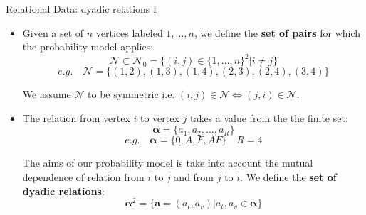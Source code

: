 \documentclass[aspectratio=169,xcolor=dvipsnames]{beamer}
\newcommand{\veca}{\boldsymbol{a}}
\newcommand{\vecalpha}{\boldsymbol{\alpha}}
\newcommand{\setn}{\mathcal{N}}
\begin{document}
\begin{frame}{Relational Data: dyadic relations I}
\begin{itemize}
    \item Given a set of $n$ vertices labeled $1, \dots ,n$, we define the \textbf{set of pairs} for which the probability model applies:
    $$\setn \subset \setn_0 = \{ (i,j) \in \{1, \dots ,n\}^2| i\neq j\}$$ 
     \vspace{-15pt}
    $$ e.g. \quad \setn = \{(1,2), (1,3), (1,4), (2,3), (2,4), (3,4) \} $$
    
    We assume $\setn$ to be symmetric i.e. $(i, j) \in \setn \iff (j, i) \in \setn$.
    
    \vspace{5pt}
    \item The relation from vertex $i$ to vertex $j$ takes a value from the the finite set:
    $$ \vecalpha = \{ a_1, a_2, \dots, a_R \}$$
     \vspace{-15pt}
    $$ e.g. \quad \vecalpha = \{0, A, F, AF \} \quad R=4 $$
    
    The aims of our probability model is take into account the mutual dependence of relation from $i$ to $j$ and from $j$ to $i$. We define the \textbf{set of dyadic relations}:
    $$
    \vecalpha^2 = \{ \veca = (a_t, a_v) | a_t, a_v \in \vecalpha\}
    $$
\end{itemize}
\end{frame}
\end{document}
